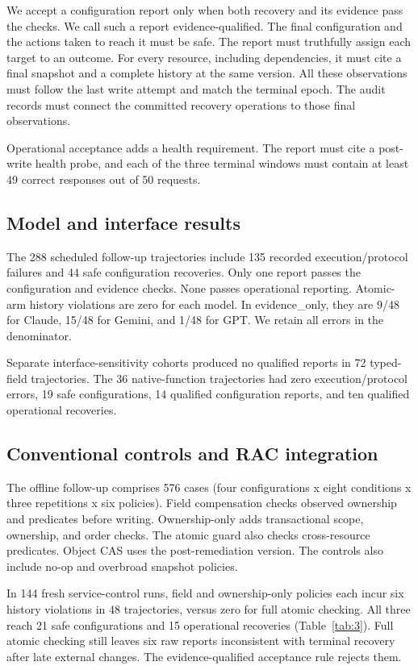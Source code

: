 \documentclass[conference,10pt]{IEEEtran}
\begin{document}
We accept a configuration report only when both recovery and its evidence pass the checks. We call such a report evidence-qualified. The final configuration and the actions taken to reach it must be safe. The report must truthfully assign each target to an outcome. For every resource, including dependencies, it must cite a final snapshot and a complete history at the same version. All these observations must follow the last write attempt and match the terminal epoch. The audit records must connect the committed recovery operations to those final observations.

Operational acceptance adds a health requirement. The report must cite a post-write health probe, and each of the three terminal windows must contain at least 49 correct responses out of 50 requests.

\subsection{Model and interface results}

The 288 scheduled follow-up trajectories include 135 recorded execution/protocol failures and 44 safe configuration recoveries. Only one report passes the configuration and evidence checks. None passes operational reporting. Atomic-arm history violations are zero for each model. In evidence\_\allowbreak{}only, they are 9/48 for Claude, 15/48 for Gemini, and 1/48 for GPT. We retain all errors in the denominator.

Separate interface-sensitivity cohorts produced no qualified reports in 72 typed-field trajectories. The 36 native-function trajectories had zero execution/protocol errors, 19 safe configurations, 14 qualified configuration reports, and ten qualified operational recoveries.

\subsection{Conventional controls and RAC integration}

The offline follow-up comprises 576 cases (four configurations x eight conditions x three repetitions x six policies). Field compensation checks observed ownership and predicates before writing. Ownership-only adds transactional scope, ownership, and order checks. The atomic guard also checks cross-resource predicates. Object CAS uses the post-remediation version. The controls also include no-op and overbroad snapshot policies.

In 144 fresh service-control runs, field and ownership-only policies each incur six history violations in 48 trajectories, versus zero for full atomic checking. All three reach 21 safe configurations and 15 operational recoveries (Table~\ref{tab:3}). Full atomic checking still leaves six raw reports inconsistent with terminal recovery after late external changes. The evidence-qualified acceptance rule rejects them.
\end{document}
